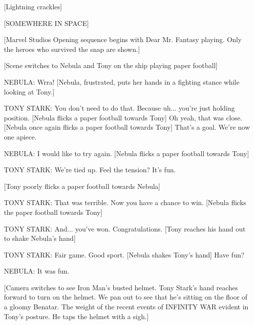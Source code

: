 [Lightning crackles]

[SOMEWHERE IN SPACE]

[Marvel Studios Opening sequence begins with Dear Mr. Fantasy playing. Only the heroes who survived the snap are shown.]

[Scene switches to Nebula and Tony on the ship playing paper football]

NEBULA: Wrra! [Nebula, frustrated, puts her hands in a fighting stance while looking at Tony.]

TONY STARK: You don't need to do that. Because uh... you're just holding position. [Nebula flicks a paper football towards Tony] Oh yeah, that was close. [Nebula once again flicks a paper football towards Tony] That's a goal. We're now one apiece.

NEBULA: I would like to try again. [Nebula flicks a paper football towards Tony]

TONY STARK: We're tied up. Feel the tension? It's fun.

[Tony poorly flicks a paper football towards Nebula]

TONY STARK: That was terrible. Now you have a chance to win. [Nebula flicks the paper football towards Tony]

TONY STARK: And... you've won. Congratulations. [Tony reaches his hand out to shake Nebula's hand]

TONY STARK: Fair game. Good sport. [Nebula shakes Tony's hand] Have fun?

NEBULA: It was fun.

[Camera switches to see Iron Man's busted helmet. Tony Stark's hand reaches forward to turn on the helmet. We pan out to see that he's sitting on the floor of a gloomy Benatar. The weight of the recent events of INFINITY WAR evident in Tony's posture. He taps the helmet with a sigh.]

